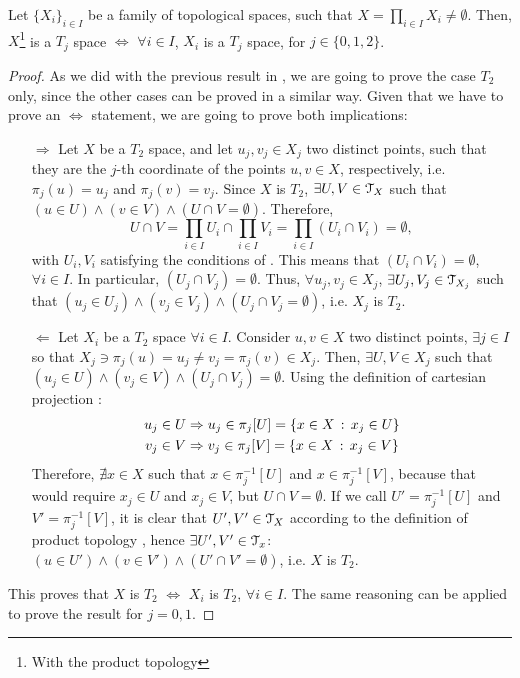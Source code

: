 \begin{theorem}
	\label{th:product-topology-separation-consistency}
	Let $\{X_i\}_{i\in I}$ be a family of topological spaces, such that \textbf{$X=\prod_{i\in I}X_i\neq \emptyset$}.
	Then, $X$\footnote{With the product topology} is a $T_j$ space $\iff$ $\forall i\in I$, $X_i$ is a $T_j$ space, for $j\in\{0,1,2\}$.
\end{theorem}
\begin{proof}
	As we did with the previous result in , we are going to prove the case $T_2$ only, since the other cases can be proved in a similar way.
	Given that we have to prove an $\iff$ statement, we are going to prove both implications:
	\begin{itemize}
	\item[$\boxed{\Rightarrow}$] Let $X$ be a $T_2$ space, and let $u_j, v_j \in X_j$ two distinct points, such that they are the $j$-th coordinate of the points $u,v\in X$, respectively, i.e. $\pi_j(u)=u_j$ and $\pi_j(v)=v_j$. Since $X$ is $T_2$, $\exists U, V\in \EuScript{T}_X$ such that $(u\in U)\land (v\in V)\land (U\cap V=\emptyset)$. Therefore,
	$$
	U\cap V= \prod_{i\in I}U_i\cap\prod_{i\in I}V_i=\prod_{i\in I}(U_i\cap V_i)=\emptyset,
	$$
	with $U_i, V_i$ satisfying the conditions of .
	This means that $(U_i\cap V_i)=\emptyset$, $\forall i\in I$. In particular, $(U_j\cap V_j)=\emptyset$.
	Thus, $\forall u_j, v_j\in X_j$, $\exists U_j, V_j \in \EuScript{T}_{X_j}$ such that $(u_j\in U_j)\land (v_j\in V_j)\land (U_j\cap V_j=\emptyset)$, i.e. $X_j$ is $T_2$.
	\item[$\boxed{\Leftarrow}$] Let $X_i$ be a $T_2$ space $\forall i\in I$. Consider $u,v\in X$ two distinct points, $\exists j\in I$ so that $X_j\ni \pi_j(u) = u_j \neq v_j=\pi_j(v)\in X_j$. Then, $\exists U,V \in X_j$ such that $(u_j\in U)\land (v_j\in V)\land (U_j\cap V_j)=\emptyset$.
	Using the definition of cartesian projection :
	\begin{align*}
		u_j\in U &\Rightarrow u_j\in\pi_j[U]=\left\{x\in X\,:\,x_j\in U\right\}\\
		v_j\in V &\Rightarrow v_j\in\pi_j[V]=\left\{x\in X\,:\,x_j\in V\right\}
	\end{align*}
	Therefore, $\nexists x\in X$ such that $x\in \pi^{-1}_j[U]$ and $x\in \pi^{-1}_j[V]$,
	because that would require $x_j\in U$ and $x_j\in V$, but $U\cap V=\emptyset$.
	If we call $U'=\pi^{-1}_j[U]$ and $V'=\pi^{-1}_j[V]$, it is clear that $U', V'\in \EuScript{T}_X$ according to the definition of product topology , hence $\exists U', V' \in \EuScript{T}_x$: $(u\in U')\land (v\in V')\land (U'\cap V'=\emptyset)$, i.e. $X$ is $T_2$.
	\end{itemize}
	This proves that $X$ is $T_2$ $\iff$ $X_i$ is $T_2$, $\forall i\in I$. The same reasoning can be applied to prove the result for $j=0,1$.
\end{proof}

